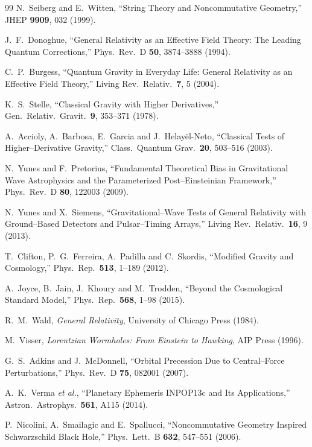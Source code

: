 \documentclass[11pt,a4paper]{article}
\begin{document}
\begin{thebibliography}{99}
N.~Seiberg and E.~Witten,
``String Theory and Noncommutative Geometry,''
JHEP \textbf{9909}, 032 (1999).

J.~F.~Donoghue,
``General Relativity as an Effective Field Theory: The Leading Quantum Corrections,''
Phys.\ Rev.\ D \textbf{50}, 3874--3888 (1994).

C.~P.~Burgess,
``Quantum Gravity in Everyday Life: General Relativity as an Effective Field Theory,''
Living Rev.\ Relativ.\ \textbf{7}, 5 (2004).

K.~S.~Stelle,
``Classical Gravity with Higher Derivatives,''
Gen.\ Relativ.\ Gravit.\ \textbf{9}, 353--371 (1978).

A.~Accioly, A.~Barbosa, E.~Garcia and J.~Helay{\"e}l-Neto,
``Classical Tests of Higher--Derivative Gravity,''
Class.\ Quantum Grav.\ \textbf{20}, 503--516 (2003).

N.~Yunes and F.~Pretorius,
``Fundamental Theoretical Bias in Gravitational Wave Astrophysics and the Parameterized Post--Einsteinian Framework,''
Phys.\ Rev.\ D \textbf{80}, 122003 (2009).

N.~Yunes and X.~Siemens,
``Gravitational--Wave Tests of General Relativity with Ground--Based Detectors and Pulsar--Timing Arrays,''
Living Rev.\ Relativ.\ \textbf{16}, 9 (2013).

T.~Clifton, P.~G.~Ferreira, A.~Padilla and C.~Skordis,
``Modified Gravity and Cosmology,''
Phys.\ Rep.\ \textbf{513}, 1--189 (2012).

A.~Joyce, B.~Jain, J.~Khoury and M.~Trodden,
``Beyond the Cosmological Standard Model,''
Phys.\ Rep.\ \textbf{568}, 1--98 (2015).

R.~M.~Wald,
\textit{General Relativity},
University of Chicago Press (1984).

M.~Visser,
\textit{Lorentzian Wormholes: From Einstein to Hawking},
AIP Press (1996).

G.~S.~Adkins and J.~McDonnell,
``Orbital Precession Due to Central--Force Perturbations,''
Phys.\ Rev.\ D \textbf{75}, 082001 (2007).

A.~K.~Verma \textit{et al.},
``Planetary Ephemeris INPOP13c and Its Applications,''
Astron.\ Astrophys.\ \textbf{561}, A115 (2014).

P.~Nicolini, A.~Smailagic and E.~Spallucci,
``Noncommutative Geometry Inspired Schwarzschild Black Hole,''
Phys.\ Lett.\ B \textbf{632}, 547--551 (2006).


\end{thebibliography}
\end{document}
